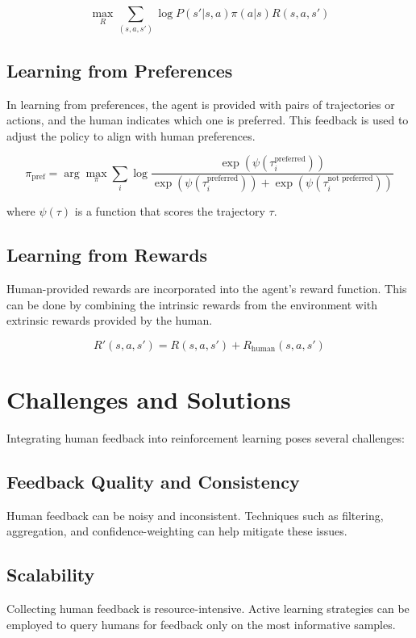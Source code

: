 \begin{equation}
\max_{R} \sum_{(s, a, s')} \log P(s'|s, a) \pi(a|s) R(s, a, s')
\end{equation}

\subsection{Learning from Preferences}
In learning from preferences, the agent is provided with pairs of trajectories or actions, and the human indicates which one is preferred. This feedback is used to adjust the policy to align with human preferences.

\begin{equation}
\pi_{\text{pref}} = \arg \max_\pi \sum_{i} \log \frac{\exp(\psi(\tau_i^\text{preferred}))}{\exp(\psi(\tau_i^\text{preferred})) + \exp(\psi(\tau_i^\text{not preferred}))}
\end{equation}

where \(\psi(\tau)\) is a function that scores the trajectory \(\tau\).

\subsection{Learning from Rewards}
Human-provided rewards are incorporated into the agent's reward function. This can be done by combining the intrinsic rewards from the environment with extrinsic rewards provided by the human.

\begin{equation}
R'(s, a, s') = R(s, a, s') + R_\text{human}(s, a, s')
\end{equation}

\section{Challenges and Solutions}
Integrating human feedback into reinforcement learning poses several challenges:

\subsection{Feedback Quality and Consistency}
Human feedback can be noisy and inconsistent. Techniques such as filtering, aggregation, and confidence-weighting can help mitigate these issues.

\subsection{Scalability}
Collecting human feedback is resource-intensive. Active learning strategies can be employed to query humans for feedback only on the most informative samples.

